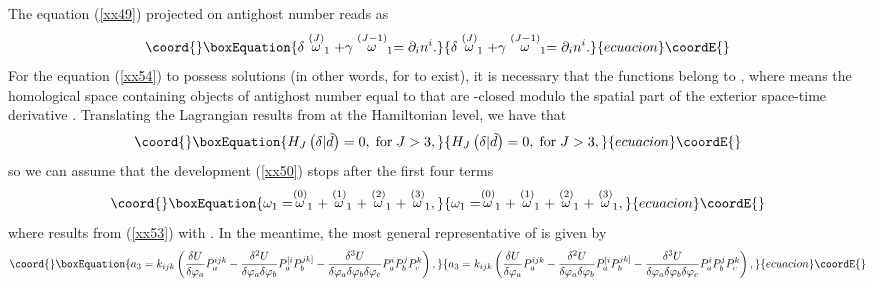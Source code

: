 \documentclass[a4paper,12pt]{article}
\begin{document}
The equation (\ref{xx49}) projected on antighost number \coordHE{}
reads as 
\begin{equation}\coord{}\boxEquation{
\delta \stackrel{(J)}{\omega }_{1}+\gamma \stackrel{(J-1)}{\omega }
_{1}=\partial _{i}n^{i}.  \label{xx54}
}{
\delta \stackrel{(J)}{\omega }_{1}+\gamma \stackrel{(J-1)}{\omega }
_{1}=\partial _{i}n^{i}.  }{ecuacion}\coordE{}\end{equation}
For the equation (\ref{xx54}) to possess solutions (in other words, for \coordHE{} to exist), it is necessary that the functions 
\coordHE{} belong to \coordHE{}, where \coordHE{} means the homological space
containing objects of antighost number equal to \coordHE{} that are \myHighlight{$\delta $}\coordHE{}%
-closed modulo the spatial part of the exterior space-time derivative \coordHE{}. Translating the Lagrangian results from \cite{gen} at the
Hamiltonian level, we have that 
\begin{equation}\coord{}\boxEquation{
H_{J}\left( \delta |\tilde{d}\right) =0,\;\mathrm{for}\;J>3,  \label{xx55}
}{
H_{J}\left( \delta |\tilde{d}\right) =0,\;\mathrm{for}\;J>3,  }{ecuacion}\coordE{}\end{equation}
so we can assume that the development (\ref{xx50}) stops after the first
four terms 
\begin{equation}\coord{}\boxEquation{
\omega _{1}=\stackrel{(0)}{\omega }_{1}+\stackrel{(1)}{\omega }_{1}+
\stackrel{(2)}{\omega }_{1}+\stackrel{(3)}{\omega }_{1},  \label{xx56}
}{
\omega _{1}=\stackrel{(0)}{\omega }_{1}+\stackrel{(1)}{\omega }_{1}+
\stackrel{(2)}{\omega }_{1}+\stackrel{(3)}{\omega }_{1},  }{ecuacion}\coordE{}\end{equation}
where \coordHE{} results from (\ref{xx53}) with \coordHE{}. In
the meantime, the most general representative of \coordHE{} is given by 
\begin{equation}\coord{}\boxEquation{
a_{3}=k_{ijk}\left( \frac{\delta U}{\delta \varphi _{a}}P_{a}^{ijk}-\frac{
\delta ^{2}U}{\delta \varphi _{a}\delta \varphi _{b}}P_{a}^{[i}P_{b}^{jk]}-
\frac{\delta ^{3}U}{\delta \varphi _{a}\delta \varphi _{b}\delta \varphi _{c}
}P_{a}^{i}P_{b}^{j}P_{c}^{k}\right) ,  \label{xx57}
}{
a_{3}=k_{ijk}\left( \frac{\delta U}{\delta \varphi _{a}}P_{a}^{ijk}-\frac{
\delta ^{2}U}{\delta \varphi _{a}\delta \varphi _{b}}P_{a}^{[i}P_{b}^{jk]}-
\frac{\delta ^{3}U}{\delta \varphi _{a}\delta \varphi _{b}\delta \varphi _{c}
}P_{a}^{i}P_{b}^{j}P_{c}^{k}\right) ,  }{ecuacion}\coordE{}\end{equation}
\end{document}
